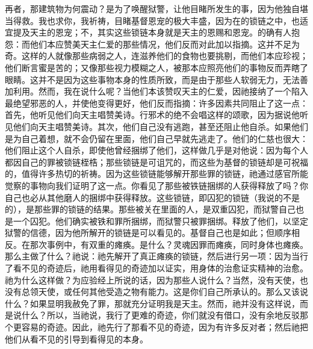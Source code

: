再者，那建筑物为何震动？是为了唤醒狱警，让他目睹所发生的事，因为他独自堪当得救。我也求你，我祈祷，目睹基督恩宠的极大丰盛，因为在的锁链之中，也适宜提及天主的恩宠；不，其实这些锁链本身就是天主的恩赐和恩宠。的确有人抱怨：而他们本应赞美天主仁爱的那些情况，他们反而对此加以指摘。这并不足为奇。这样的人就像那些病弱之人，连滋养他们的食物也要挑剔，而他们本应珍视；他们断言蜜是苦的；又像那些视力模糊之人，被那本应照亮他们的事物反而弄瞎了眼睛。这并不是因为这些事物本身的性质所致，而是由于那些人软弱无力，无法善加利用。然而，我在说什么呢？当他们本该赞叹天主的仁爱，因祂接纳了一个陷入最绝望邪恶的人，并使他变得更好，他们反而指摘：许多因素共同阻止了这一点：首先，他听见他们向天主唱赞美诗。行邪术的绝不会唱这样的颂歌，因为据说他听见他们向天主唱赞美诗。其次，他们自己没有逃跑，甚至还阻止他自杀。如果他们是为自己着想，就不会仍留在里面，他们自己早就先逃走了。他们的仁慈也很大：他们阻止这个人自杀，即使他曾经捆绑了他们，这样做几乎是对他说：因为每个人都因自己的罪被锁链桎梏；那些锁链是可诅咒的，而这些为基督的锁链却是可祝福的，值得许多热切的祈祷。因为这些锁链能够解开那些罪的锁链，祂通过感官所能觉察的事物向我们证明了这一点。你看见了那些被铁链捆绑的人获得释放了吗？你自己也必从其他磨人的捆绑中获得释放。这些锁链，即囚犯的锁链（我说的不是的），是那些罪的锁链的结果。那些被关在里面的人，是双重囚犯，而狱警自己也是一个囚犯。他们确实被铁和罪所捆绑，而狱警只被罪捆绑。释放了他们，以坚定狱警的信德，因为他所解开的锁链是可以看见的。基督自己也是如此；但顺序相反。在那次事例中，有双重的瘫痪。是什么？灵魂因罪而瘫痪，同时身体也瘫痪。那么主做了什么？祂说：祂先解开了真正瘫痪的锁链，然后进行另一项：因为当行了看不见的奇迹后，祂用看得见的奇迹加以证实，用身体的治愈证实精神的治愈。祂为什么这样做？为应验经上所说的话，因为那些人说什么？当然，没有天使，也没有总领天使，或任何其他受造之物有能力。这是你们自己所承认的。那么又该说什么？如果显明我赦免了罪，那就充分证明我是天主。然而，祂并没有这样说，而是说什么？所以，当祂说，我行了更难的奇迹，你们就没有借口，没有余地反驳那个更容易的奇迹。因此，祂先行了那看不见的奇迹，因为有许多反对者；然后祂把他们从看不见的引导到看得见的本身。\par

